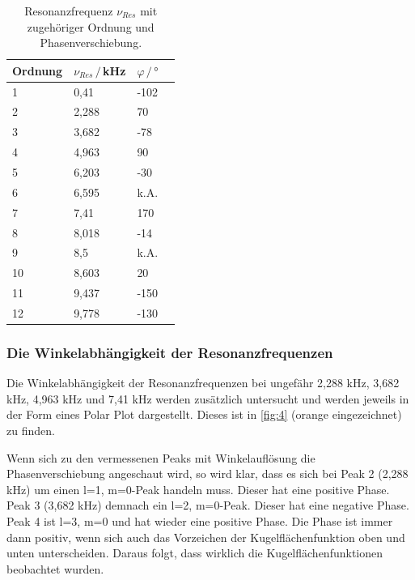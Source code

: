 \begin{table}[H]
    \center
    \caption{Resonanzfrequenz $\nu_{Res}$ mit zugehöriger Ordnung und Phasenverschiebung.}
    \label{tab:1}
    \begin{tabular}{l l l c}
        \toprule
        Ordnung & $\nu_{Res}\,/\,$kHz & $\varphi\,/\,°$\\
        \midrule
        1 &0,41   & -102  \\
        2 &2,288 &   70  \\
        3 &3,682 &  -78  \\
        4 &4,963 &   90  \\
        5 &6,203 &  -30  \\
        6 &6,595 &  k.A. \\
        7 &7,41 &  170  \\
        8 &8,018 &  -14  \\
        9 & 8,5 & k.A. \\
        10 &8,603 &   20  \\
        11 &9,437 & -150  \\
        12 &9,778 & -130  \\
        \bottomrule
    \end{tabular}
\end{table}

\subsubsection{Die Winkelabhängigkeit der Resonanzfrequenzen}

Die Winkelabhängigkeit der Resonanzfrequenzen bei ungefähr 2,288 kHz, 3,682 kHz, 4,963 kHz und 7,41 kHz werden zusätzlich untersucht und werden jeweils in der Form eines Polar Plot
dargestellt. Dieses ist in \autoref{fig:4} (orange eingezeichnet) zu finden.

\noindent
Wenn sich zu den vermessenen Peaks mit Winkelauflösung die Phasenverschiebung angeschaut wird, so wird klar, dass es sich bei
 Peak 2 (2,288 kHz) um einen l=1, m=0-Peak handeln muss. Dieser hat eine positive Phase. Peak 3 (3,682 kHz) demnach ein l=2, m=0-Peak. Dieser hat eine negative Phase. 
 Peak 4 ist l=3, m=0 und hat wieder eine positive Phase. Die Phase ist immer dann positiv, 
wenn sich auch das Vorzeichen der Kugelflächenfunktion oben und unten unterscheiden. Daraus folgt, dass wirklich die Kugelflächenfunktionen beobachtet wurden.

